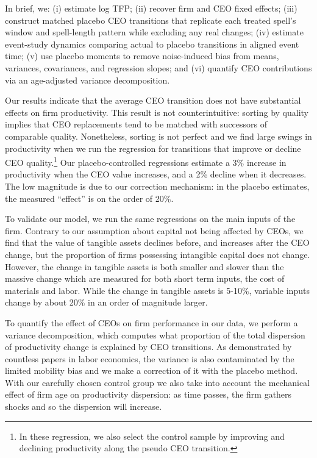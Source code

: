 \documentclass[11pt,a4paper]{article}
\begin{document}
In brief, we: (i) estimate log TFP; (ii) recover firm and CEO fixed effects; (iii) construct matched placebo CEO transitions that replicate each treated spell’s window and spell-length pattern while excluding any real changes; (iv) estimate event-study dynamics comparing actual to placebo transitions in aligned event time; (v) use placebo moments to remove noise-induced bias from means, variances, covariances, and regression slopes; and (vi) quantify CEO contributions via an age-adjusted variance decomposition.

Our results indicate that the average CEO transition does not have substantial effects on firm productivity. This result is not counterintuitive: sorting by quality implies that CEO replacements tend to be matched with successors of comparable quality. Nonetheless, sorting is not perfect and we find large swings in productivity when we run the regression for transitions that improve or decline CEO quality.\footnote{In these regression, we also select the control sample by improving and declining productivity along the pseudo CEO transition.} Our placebo-controlled regressions estimate a 3\% increase in productivity when the CEO value increases, and a 2\% decline when it decreases. The low magnitude is due to our correction mechanism: in the placebo estimates, the measured ``effect'' is on the order of 20\%.  

To validate our model, we run the same regressions on the main inputs of the firm. Contrary to our assumption about capital not being affected by CEOs, we find that the value of tangible assets declines before, and increases after the CEO change, but the proportion of firms possessing intangible capital does not change. However, the change in tangible assets is both smaller and slower than the massive change which are measured for both short term inputs, the cost of materials and labor. While the change in tangible assets is 5-10\%, variable inputs change by about 20\% in an order of magnitude larger.

To quantify the effect of CEOs on firm performance in our data, we perform a variance decomposition, which computes what proportion of the total dispersion of productivity change is explained by CEO transitions. As demonstrated by countless papers in labor economics, the variance is also contaminated by the limited mobility bias and we make a correction of it with the  placebo method. With our carefully chosen control group we also take into account the mechanical effect of firm age on productivity dispersion: as time passes, the firm gathers shocks and so the dispersion will increase. 
\end{document}
